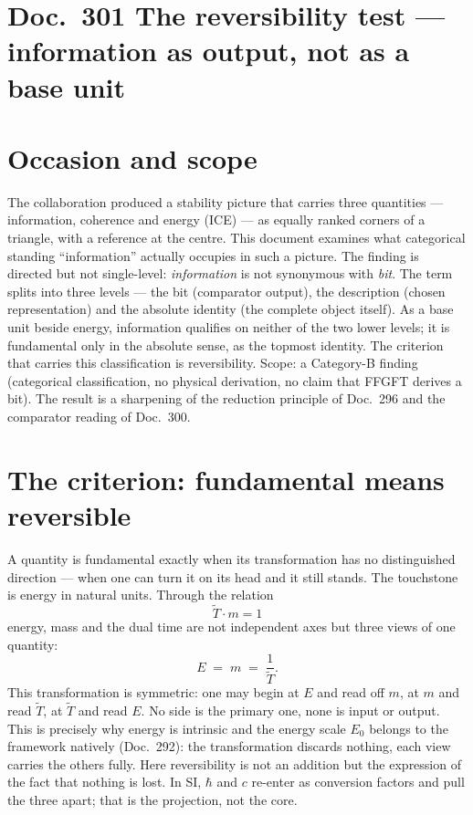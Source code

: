 
\section*{Doc.~301 \quad The reversibility test --- information as output, not
as a base unit}

\section{Occasion and scope}

The collaboration produced a stability picture that carries three quantities ---
information, coherence and energy (ICE) --- as equally ranked corners of a
triangle, with a reference at the centre. This document examines what
categorical standing \enquote{information} actually occupies in such a picture.
The finding is directed but not single-level: \emph{information} is not
synonymous with \emph{bit}. The term splits into three levels --- the bit
(comparator output), the description (chosen representation) and the absolute
identity (the complete object itself). As a base unit beside energy, information
qualifies on neither of the two lower levels; it is fundamental only in the
absolute sense, as the topmost identity. The criterion that carries this
classification is reversibility. Scope: a Category-B finding (categorical
classification, no physical derivation, no claim that FFGFT derives a bit). The
result is a sharpening of the reduction principle of Doc.~296 and the comparator
reading of Doc.~300.

\section{The criterion: fundamental means reversible}

A quantity is fundamental exactly when its transformation has no distinguished
direction --- when one can turn it on its head and it still stands. The
touchstone is energy in natural units. Through the relation
\begin{equation}
  \tilde{T}\cdot m = 1
\end{equation}
energy, mass and the dual time are not independent axes but three views of one
quantity:
\begin{equation}
  E \;=\; m \;=\; \frac{1}{\tilde{T}}.
\end{equation}
This transformation is symmetric: one may begin at $E$ and read off $m$, at $m$
and read $\tilde{T}$, at $\tilde{T}$ and read $E$. No side is the primary one,
none is input or output. This is precisely why energy is intrinsic and the
energy scale $E_0$ belongs to the framework natively (Doc.~292): the
transformation discards nothing, each view carries the others fully. Here
reversibility is not an addition but the expression of the fact that nothing is
lost. In SI, $\hbar$ and $c$ re-enter as conversion factors and pull the three
apart; that is the projection, not the core.

